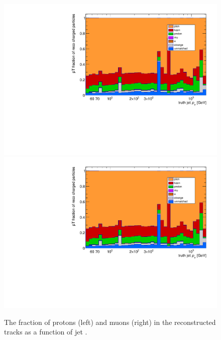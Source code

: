 \begin{figure}
\centering
\includegraphics[scale=0.3, page=6]{figures/jet_comp_study_powheg_Tight_pTFraction.pdf}
\includegraphics[scale=0.3, page=7]{figures/jet_comp_study_powheg_Tight_pTFraction.pdf}
\caption {The fraction of protons (left) and muons (right) in the reconstructed tracks as a function of jet \pT.}
\label{fig:response protons and muons}
\end{figure}


